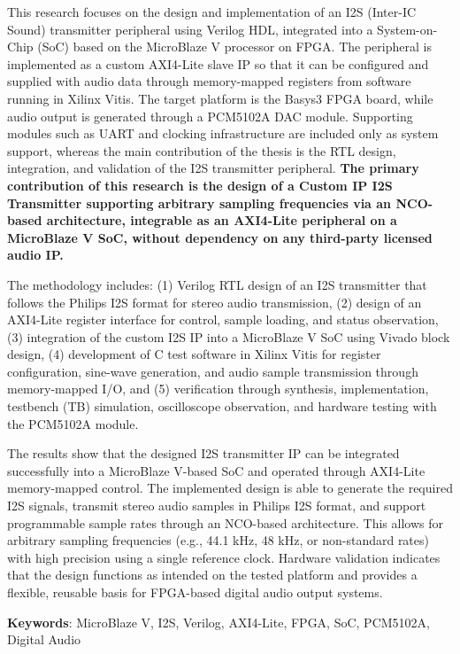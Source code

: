 \hspace{1cm}This research focuses on the design and implementation of an I2S (Inter-IC Sound) transmitter peripheral using Verilog HDL, integrated into a System-on-Chip (SoC) based on the MicroBlaze V processor on FPGA. The peripheral is implemented as a custom AXI4-Lite slave IP so that it can be configured and supplied with audio data through memory-mapped registers from software running in Xilinx Vitis. The target platform is the Basys3 FPGA board, while audio output is generated through a PCM5102A DAC module. Supporting modules such as UART and clocking infrastructure are included only as system support, whereas the main contribution of the thesis is the RTL design, integration, and validation of the I2S transmitter peripheral. \textbf{The primary contribution of this research is the design of a Custom IP I2S Transmitter supporting arbitrary sampling frequencies via an NCO-based architecture, integrable as an AXI4-Lite peripheral on a MicroBlaze V SoC, without dependency on any third-party licensed audio IP.}

\hspace{1cm}The methodology includes: (1) Verilog RTL design of an I2S transmitter that follows the Philips I2S format for stereo audio transmission, (2) design of an AXI4-Lite register interface for control, sample loading, and status observation, (3) integration of the custom I2S IP into a MicroBlaze V SoC using Vivado block design, (4) development of C test software in Xilinx Vitis for register configuration, sine-wave generation, and audio sample transmission through memory-mapped I/O, and (5) verification through synthesis, implementation, testbench (TB) simulation, oscilloscope observation, and hardware testing with the PCM5102A module.

\hspace{1cm}The results show that the designed I2S transmitter IP can be integrated successfully into a MicroBlaze V-based SoC and operated through AXI4-Lite memory-mapped control. The implemented design is able to generate the required I2S signals, transmit stereo audio samples in Philips I2S format, and support programmable sample rates through an NCO-based architecture. This allows for arbitrary sampling frequencies (e.g., 44.1 kHz, 48 kHz, or non-standard rates) with high precision using a single reference clock. Hardware validation indicates that the design functions as intended on the tested platform and provides a flexible, reusable basis for FPGA-based digital audio output systems.


\noindent\textbf{Keywords}: MicroBlaze V, I2S, Verilog, AXI4-Lite, FPGA, SoC, PCM5102A, Digital Audio

